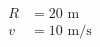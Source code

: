 \documentclass[preview]{standalone}
\begin{document}
\begin{align*}
R &= 20 \text{ m} \\ v &= 10 \text{ m/s}
\end{align*}
\end{document}

